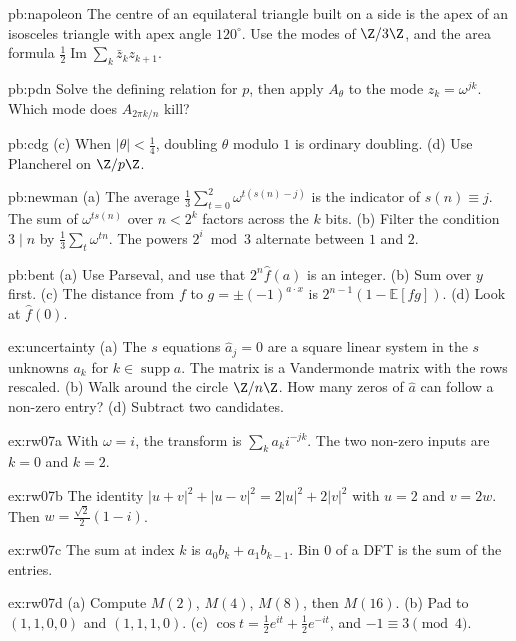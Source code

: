 \begin{hint}{pb:napoleon}
The centre of an equilateral triangle built on a side is the apex of an isosceles triangle with apex angle $120^\circ$. Use the modes of $\Z/3\Z$, and the area formula $\frac12\operatorname{Im}\sum_k\bar z_kz_{k+1}$.
\end{hint}

\begin{hint}{pb:pdn}
Solve the defining relation for $p$, then apply $A_\theta$ to the mode $z_k=\omega^{jk}$. Which mode does $A_{2\pi k/n}$ kill?
\end{hint}

\begin{hint}{pb:cdg}
(c) When $|\theta|<\frac14$, doubling $\theta$ modulo $1$ is ordinary doubling. (d) Use Plancherel on $\Z/p\Z$.
\end{hint}

\begin{hint}{pb:newman}
(a) The average $\frac13\sum_{t=0}^2\omega^{t(s(n)-j)}$ is the indicator of $s(n)\equiv j$. The sum of $\omega^{ts(n)}$ over $n<2^k$ factors across the $k$ bits.
(b) Filter the condition $3\mid n$ by $\frac13\sum_t\omega^{tn}$. The powers $2^i\bmod3$ alternate between $1$ and $2$.
\end{hint}

\begin{hint}{pb:bent}
(a) Use Parseval, and use that $2^n\hat f(a)$ is an integer. (b) Sum over $y$ first. (c) The distance from $f$ to $g=\pm(-1)^{a\cdot x}$ is $2^{n-1}(1-\mathbb E[fg])$. (d) Look at $\hat f(0)$.
\end{hint}

\begin{hint}{ex:uncertainty}
(a) The $s$ equations $\hat a_j=0$ are a square linear system in the $s$ unknowns $a_k$ for $k\in\operatorname{supp}a$. The matrix is a Vandermonde matrix with the rows rescaled. (b) Walk around the circle $\Z/n\Z$. How many zeros of $\hat a$ can follow a non-zero entry? (d) Subtract two candidates.
\end{hint}

\begin{hint}{ex:rw07a}
With $\omega=i$, the transform is $\sum_k a_k i^{-jk}$. The two non-zero inputs are $k=0$ and $k=2$.
\end{hint}
\begin{hint}{ex:rw07b}
The identity $|u+v|^2+|u-v|^2=2|u|^2+2|v|^2$ with $u=2$ and $v=2w$. Then $w=\frac{\sqrt2}2(1-i)$.
\end{hint}
\begin{hint}{ex:rw07c}
The sum at index $k$ is $a_0b_k+a_1b_{k-1}$. Bin $0$ of a DFT is the sum of the entries.
\end{hint}
\begin{hint}{ex:rw07d}
(a) Compute $M(2)$, $M(4)$, $M(8)$, then $M(16)$. (b) Pad to $(1,1,0,0)$ and $(1,1,1,0)$. (c) $\cos t=\frac12 e^{it}+\frac12 e^{-it}$, and $-1\equiv3\pmod4$.
\end{hint}

